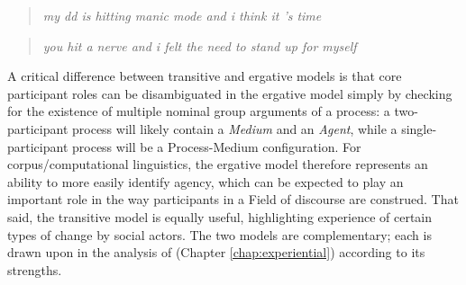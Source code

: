 \begin{multicols}{2}
\begin{quote}
\small
\noindent {}

\noindent \emph{my dd is hitting manic mode and i think it 's time} 
\end{quote}

\begin{quote}
\small
\noindent {}

\noindent \emph{you hit a nerve and i felt the need to stand up for myself} %
\end{quote}
\end{multicols}
%
\noindent A critical difference between transitive and ergative models is that core participant roles can be disambiguated in the ergative model simply by checking for the existence of multiple nominal group arguments of a process: a two\hyp{}participant process will likely contain a \emph{Medium} and an \emph{Agent}, while a single\hyp{}participant process will be a Process\hyp{}Medium configuration. For corpus\slash computational linguistics, the ergative model therefore represents an ability to more easily identify agency, which can be expected to play an important role in the way participants in a Field of discourse are construed. That said, the transitive model is equally useful, highlighting experience of certain types of change by social actors. The two models are complementary; each is drawn upon in the analysis of  (Chapter \ref{chap:experiential}) according to its strengths.





